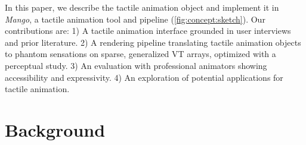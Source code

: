 In this paper, we describe the tactile animation object and implement it in \emph{Mango}, a tactile animation tool and pipeline (\autoref{fig:concept:sketch}).
Our contributions are: 
1)  A tactile animation interface grounded in user interviews and prior literature.
2) A rendering pipeline translating tactile animation objects %
to phantom sensations on sparse, generalized VT arrays, optimized with a perceptual study.
3) An evaluation with professional animators showing accessibility and expressivity.
4) An exploration of  potential applications for tactile animation.

%
%
\section{Background}

%
%


